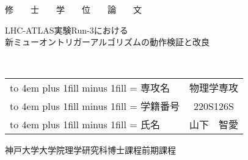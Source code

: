\addtocounter{page}{-3}
\thispagestyle{empty}

\vspace*{1.5cm}

\newcommand{\kintou}[2]{%
  \leavevmode
  \hbox to #1{%
    \kanjiskip=0pt plus 1fill minus 1fill
    \xkanjiskip=\kanjiskip
    #2}}

\begin{center}
  \begin{huge}
    修　　士　　学　　位　　論　　文
  \end{huge}

  \vspace{2cm}

  \begin{huge}
    \begin{spacing}{1.1}
      \fontsize{18.4pt}{20pt}\selectfont
        LHC-ATLAS実験Run-3における\\新ミューオントリガーアルゴリズムの動作検証と改良
    \end{spacing}
  \end{huge}
  
  \vspace{3cm}

  \begin{LARGE}
    \begin{spacing}{1.1}
        \flushright \submitdate\\
        \vspace{1cm}
            \begin{center}
                \begin{tabular}{p{6.5em}c}
                    \kintou{4em}{専攻名}   & 物理学専攻 \\
                    \kintou{4em}{学籍番号} & 220S126S  \\
                    \kintou{4em}{氏名}     & 山下　智愛 \\
                \end{tabular}                
            \end{center}
    \end{spacing}
  \end{LARGE}

  \vspace{4.0cm}

  \begin{LARGE}
    \fontsize{17pt}{20pt}\selectfont
    神戸大学大学院理学研究科博士課程前期課程
  \end{LARGE}
\end{center}
